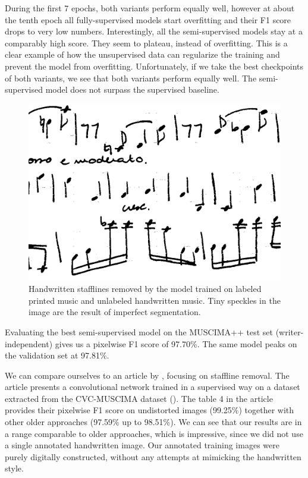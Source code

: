 During the first 7 epochs, both variants perform equally well, however at about the tenth epoch all fully-supervised models start overfitting and their F1 score drops to very low numbers. Interestingly, all the semi-supervised models stay at a comparably high score. They seem to plateau, instead of overfitting. This is a clear example of how the unsupervised data can regularize the training and prevent the model from overfitting. Unfortunately, if we take the best checkpoints of both variants, we see that both variants perform equally well. The semi-supervised model does not surpass the supervised baseline.

\begin{figure}[ht]
    \centering
    \includegraphics[width=140mm]{../../figures/04-staffline-transfer/staffline-removal.png}
    \caption{Handwritten stafflines removed by the model trained on labeled printed music and unlabeled handwritten music. Tiny speckles in the image are the result of imperfect segmentation.}
    \label{fig:StafflineRemoval}
\end{figure}

Evaluating the best semi-supervised model on the MUSCIMA++ test set (writer-independent) gives us a pixelwise F1 score of 97.70\%. The same model peaks on the validation set at 97.81\%. 

We can compare ourselves to an article by \cite{StafflineDetection}, focusing on staffline removal. The article presents a convolutional network trained in a supervised way on a dataset extracted from the CVC-MUSCIMA dataset (\cite{CvcMuscima}). The table 4 in the article provides their pixelwise F1 score on undistorted images (99.25\%) together with other older approaches (97.59\% up to 98.51\%). We can see that our results are in a range comparable to older approaches, which is impressive, since we did not use a single annotated handwritten image. Our annotated training images were purely digitally constructed, without any attempts at mimicking the handwritten style.

